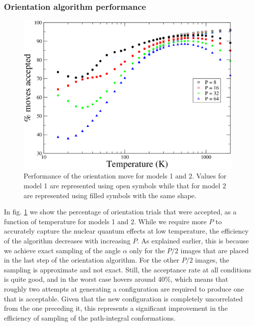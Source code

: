             \subsubsection{Orientation algorithm performance}
                \label{sec:orPerformance}
                \begin{figure}[!htbp]
                    \centering
                    \includegraphics[scale=0.20,keepaspectratio]{Chapter-4/Figures/s12orAcc.png}
                    \caption{Performance of the orientation move for models 1 and 2. Values for model 1 are represented using open symbols while that for model 2 are represented using filled symbols with the same shape.}
                    \label{fig:r0Acc}
                \end{figure}

                In fig. \ref{fig:r0Acc} we show the percentage of orientation trials that were accepted, as a function of temperature for models 1 and 2. While we require more $P$ to accurately capture the nuclear quantum effects at low temperature, the efficiency of the algorithm decreases with increasing $P$. As explained earlier, this is because we achieve exact sampling of the angle $\alpha$ only for the $P/2$ images that are placed in the last step of the orientation algorithm. For the other $P/2$ images, the sampling is approximate and not exact. Still, the acceptance rate at all conditions is quite good, and in the worst case hovers around 40\%, which means that roughly two attempts at generating a configuration are required to produce one that is acceptable. Given that the new configuration is completely uncorrelated from the one preceding it, this represents a significant improvement in the efficiency of sampling of the path-integral conformations.

